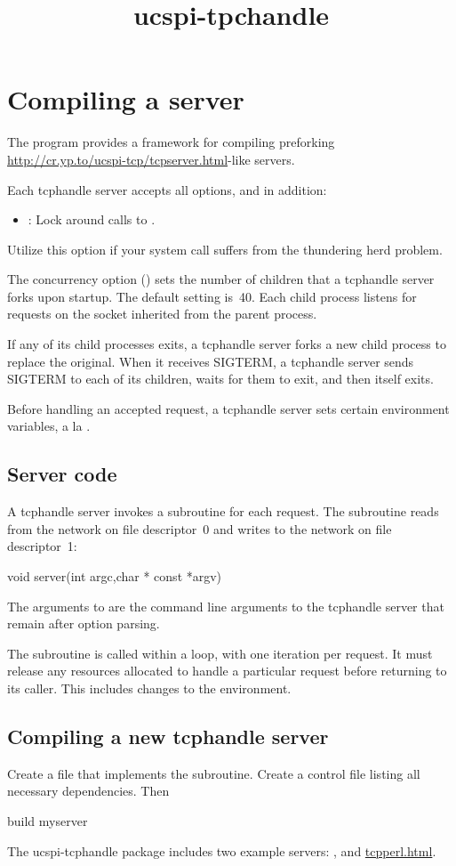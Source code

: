 \documentclass{book}
\title{ucspi-tpchandle}
\begin{document}
\section{Compiling a  server}

The  program provides a framework for compiling
preforking
\href{\cmd{tcpserver}}{http://cr.yp.to/ucspi-tcp/tcpserver.html}-like
servers.

Each tcphandle server accepts all  options, and in
addition:
\begin{itemize}
  \item {}:
    Lock  around calls to .
\end{itemize}
Utilize this option if your  system call suffers from the
thundering herd problem.

The concurrency option () sets the number of children that a
tcphandle server forks upon startup.  The default setting is~40.  Each
child process listens for requests on the socket inherited from the
parent process.

If any of its child processes exits, a tcphandle server forks a new
child process to replace the original.  When it receives SIGTERM, a
tcphandle server sends SIGTERM to each of its children, waits for them
to exit, and then itself exits.

Before handling an accepted request, a tcphandle server sets certain
environment variables, a la .

\subsection{Server code}
A tcphandle server invokes a  subroutine for each request.
The subroutine reads from the network on file descriptor~0 and writes to
the network on file descriptor~1:
\begin{code}%
  void server(int argc,char * const *argv)
\end{code}
The arguments to  are the command line arguments to the
tcphandle server that remain after option parsing.

The  subroutine is called within a loop, with one iteration
per request.  It must release any resources allocated to handle a
particular request before returning to its caller.  This includes
changes to the environment.

\subsection{Compiling a new tcphandle server}
Create a file  that implements the 
subroutine.  Create a control file  listing all
necessary dependencies.  Then
\begin{code}%
  build myserver
\end{code}

The ucspi-tcphandle package includes two example servers:
, and \href{\cmd{tcpperl}}{tcpperl.html}.
\end{document}
